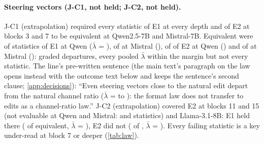 \paragraph{Steering vectors (J-C1, not held; J-C2, not held).} J-C1 (extrapolation) required every statistic of E1 at every depth and of E2 at blocks 3 and 7 to be equivalent at Qwen2.5-7B and Mistral-7B. Equivalent were \JcOneNeqEoneQwenSeven{} of \JcOneNstatEoneQwenSeven{} statistics of E1 at Qwen ($\bar\lambda$ = \JcOnePoolEoneQwenSeven{}), \JcOneNeqEoneMistralSeven{} of \JcOneNstatEoneMistralSeven{} at Mistral (\JcOnePoolEoneMistralSeven{}), \JcOneNeqEtwoQwenSeven{} of \JcOneNstatEtwoQwenSeven{} of E2 at Qwen (\JcOnePoolEtwoQwenSeven{}) and \JcOneNeqEtwoMistralSeven{} of \JcOneNstatEtwoMistralSeven{} at Mistral (\JcOnePoolEtwoMistralSeven{}): graded departures, every pooled $\bar\lambda$ within the margin but not every statistic. The line's pre-written sentence (the main text's paragraph on the law opens instead with the outcome text below and keeps the sentence's second clause; \cref{app:decisions}): ``Even steering vectors close to the natural edit depart from the natural channel ratio ($\bar\lambda$ = \JcOnePoolEoneMistralSeven{} to \JcOnePoolEtwoMistralSeven{}): the format law does not transfer to edits as a channel-ratio law.'' J-C2 (extrapolation) covered E2 at blocks 11 and 15 (not evaluable at Qwen and Mistral: \JcTwoNstatEtwoQwenSeven{} and \JcTwoNstatEtwoMistralSeven{} statistics) and Llama-3.1-8B: E1 held there (\JcTwoNeqEoneLlamaEight{} of \JcTwoNstatEoneLlamaEight{} equivalent, $\bar\lambda$ = \JcTwoPoolEoneLlamaEight{}), E2 did not (\JcTwoNeqEtwoLlamaEight{} of \JcTwoNstatEtwoLlamaEight{}, $\bar\lambda$ = \JcTwoPoolEtwoLlamaEight{}). Every failing statistic is a key under-read at block 7 or deeper (\cref{tab:law}). %

